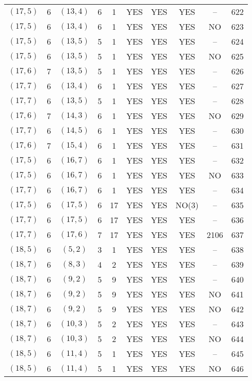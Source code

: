 \begin{longtable}{|c|c|c|c|c|c|c|c|c|c|}
$(17, 5)$ & 6 & $(13, 4)$ & 6 & 1 & YES & YES & YES & -- & 622\\
$(17, 5)$ & 6 & $(13, 4)$ & 6 & 1 & YES & YES & YES & NO & 623\\
$(17, 5)$ & 6 & $(13, 5)$ & 5 & 1 & YES & YES & YES & -- & 624\\
$(17, 5)$ & 6 & $(13, 5)$ & 5 & 1 & YES & YES & YES & NO & 625\\
$(17, 6)$ & 7 & $(13, 5)$ & 5 & 1 & YES & YES & YES & -- & 626\\
$(17, 7)$ & 6 & $(13, 4)$ & 6 & 1 & YES & YES & YES & -- & 627\\
$(17, 7)$ & 6 & $(13, 5)$ & 5 & 1 & YES & YES & YES & -- & 628\\
$(17, 6)$ & 7 & $(14, 3)$ & 6 & 1 & YES & YES & YES & NO & 629\\
$(17, 7)$ & 6 & $(14, 5)$ & 6 & 1 & YES & YES & YES & -- & 630\\
$(17, 6)$ & 7 & $(15, 4)$ & 6 & 1 & YES & YES & YES & -- & 631\\
$(17, 5)$ & 6 & $(16, 7)$ & 6 & 1 & YES & YES & YES & -- & 632\\
$(17, 5)$ & 6 & $(16, 7)$ & 6 & 1 & YES & YES & YES & NO & 633\\
$(17, 7)$ & 6 & $(16, 7)$ & 6 & 1 & YES & YES & YES & -- & 634\\
$(17, 5)$ & 6 & $(17, 5)$ & 6 & 17 & YES & YES & NO(3) & -- & 635\\
$(17, 7)$ & 6 & $(17, 5)$ & 6 & 17 & YES & YES & YES & -- & 636\\
$(17, 7)$ & 6 & $(17, 6)$ & 7 & 17 & YES & YES & YES & 2106 & 637\\
$(18, 5)$ & 6 & $(5, 2)$ & 3 & 1 & YES & YES & YES & -- & 638\\
$(18, 7)$ & 6 & $(8, 3)$ & 4 & 2 & YES & YES & YES & -- & 639\\
$(18, 7)$ & 6 & $(9, 2)$ & 5 & 9 & YES & YES & YES & -- & 640\\
$(18, 7)$ & 6 & $(9, 2)$ & 5 & 9 & YES & YES & YES & NO & 641\\
$(18, 7)$ & 6 & $(9, 2)$ & 5 & 9 & YES & YES & YES & NO & 642\\
$(18, 7)$ & 6 & $(10, 3)$ & 5 & 2 & YES & YES & YES & -- & 643\\
$(18, 7)$ & 6 & $(10, 3)$ & 5 & 2 & YES & YES & YES & NO & 644\\
$(18, 5)$ & 6 & $(11, 4)$ & 5 & 1 & YES & YES & YES & -- & 645\\
$(18, 5)$ & 6 & $(11, 4)$ & 5 & 1 & YES & YES & YES & NO & 646\\

\end{longtable}
